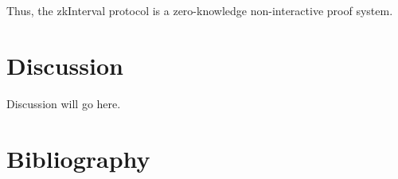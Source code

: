 \documentclass[version=preprint]{iacrcc}
\begin{document}
Thus, the zkInterval protocol is a zero-knowledge non-interactive proof system.

\section{Discussion}

Discussion will go here.

\section{Bibliography}

\end{document}
